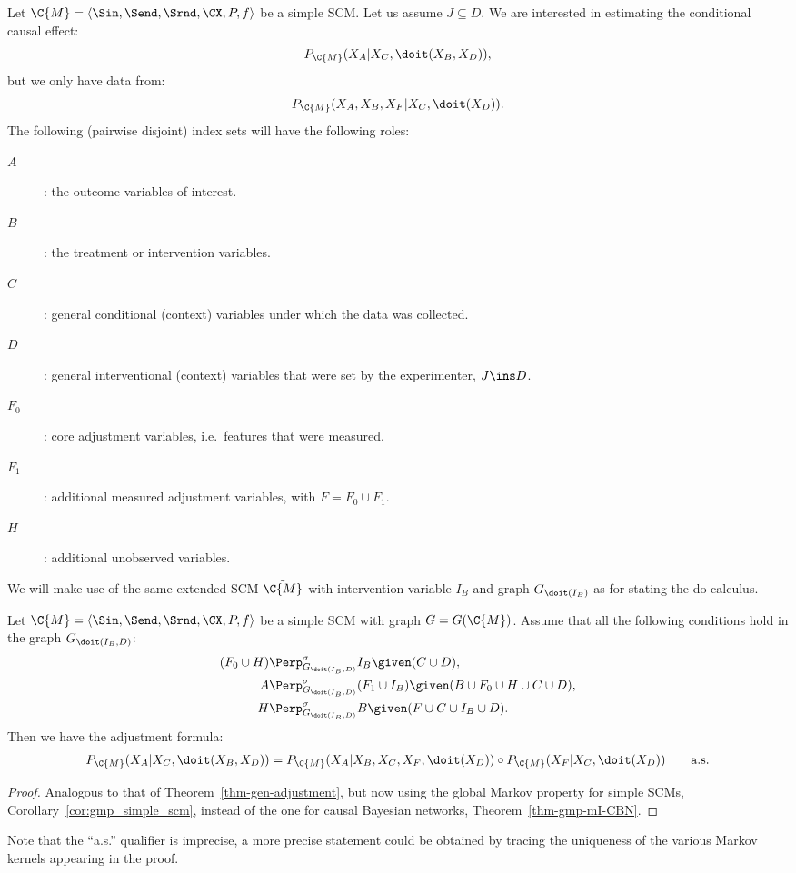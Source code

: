 Let $\C{M} = \langle \Sin, \Send, \Srnd, \CX, P, f \rangle$ be a simple SCM.
Let us assume $J \subseteq D$.
We are interested in estimating the conditional causal effect:
\[ P_{\C{M}}(X_A|X_C,\doit(X_B,X_D)), \]
but we only have data from:
\[ P_{\C{M}}(X_A,X_B,X_F|X_C,\doit(X_D)). \]
The following (pairwise disjoint) index sets will have the following roles:
\begin{description}
  \item[$A$]: the outcome variables of interest.
  \item[$B$]: the treatment or intervention variables.
  \item[$C$]: general conditional (context) variables under which the data was collected.
  \item[$D$]: general interventional (context) variables that were set by the experimenter, $J \ins D$.
  \item[$F_0$]: core adjustment variables, i.e.\ features that were measured.
  \item[$F_1$]: additional measured adjustment variables, with $F = F_0 \cup F_1$.
  \item[$H$]: additional unobserved variables.
\end{description}
We will make use of the same extended SCM $\tilde{\C{M}}$ with intervention variable $I_B$ and graph
$G_{\doit(I_B)}$ as for stating the do-calculus.

\begin{Thm}\label{thm:gen-adjustment-scms}
Let $\C{M} = \langle \Sin, \Send, \Srnd, \CX, P, f \rangle$ be a simple SCM with graph $G = G(\C{M})$.
    Assume that all the following conditions hold in the graph $G_{\doit(I_B,D)}$: %
    \begin{align}
        (F_0 \cup H) & \Perp^\sigma_{G_{\doit(I_B,D)}} I_B \given (C \cup D), \\
        A & \Perp^\sigma_{G_{\doit(I_B,D)}} (F_1 \cup I_B) \given (B \cup F_0 \cup H \cup C \cup D), \\
                      H &\Perp^\sigma_{G_{\doit(I_B,D)}} B \given (F \cup C \cup  I_B \cup D).
    \end{align}
Then we have the adjustment formula:
\[ P_{\C{M}}(X_A|X_C,\doit(X_B,X_D)) = 
    P_{\C{M}}(X_A|X_B,X_C,X_F,\doit(X_D)) \circ P_{\C{M}}(X_F|X_C,\doit(X_D)) \qquad \text{a.s.}
\]
\end{Thm}
\begin{proof}
  Analogous to that of Theorem~\ref{thm-gen-adjustment}, but now using
  the global Markov property for simple SCMs, Corollary~\ref{cor:gmp_simple_scm}, 
  instead of the one for causal Bayesian networks, Theorem~\ref{thm-gmp-mI-CBN}. 
\end{proof}
Note that the ``a.s.'' qualifier is imprecise, a more precise statement could be obtained by tracing the 
uniqueness of the various Markov kernels appearing in the proof.

